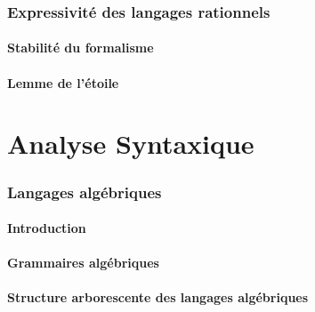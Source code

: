 \section{Expressivité des langages rationnels}
 
\subsection{Stabilité du formalisme}



 
\subsection{Lemme de l'étoile}






\part{Analyse Syntaxique}
 
 
\section{Langages algébriques}
 
\subsection{Introduction}


 
\subsection{Grammaires algébriques}





 
\subsection{Structure arborescente des langages algébriques}




 
